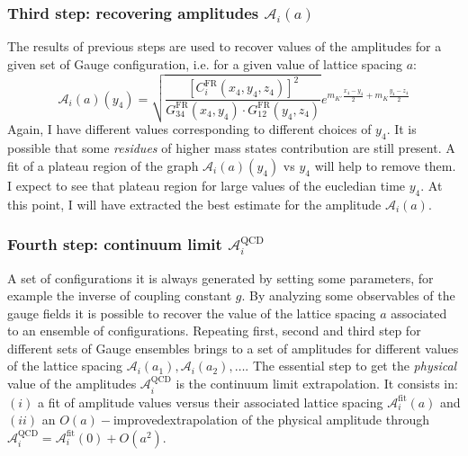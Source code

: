\documentclass[english, LaM, oneside, noexaminfo]{sapthesis}
\newcommand{\oaid}{$O(a)-$improved}
\begin{document}
\subsubsection*{Third step: recovering amplitudes $\mathcal{A}_i(a)$}
\noindent
The results of previous steps are used to recover values of the amplitudes for a given set of Gauge configuration, i.e. for a given value of lattice spacing $a$:
\begin{equation*}
    \mathcal{A}_i (a) (y_4) = \sqrt{\frac{\left[C_i^\text{FR}(x_4,y_4,z_4)\right]^2}{G_{34}^\text{FR}(x_4,y_4) \cdot G_{12}^\text{FR}(y_4,z_4)}} e^{m_{K'}\frac{x_4-y_4}{2} + m_{K}\frac{y_4-z_4}{2}}
\end{equation*}
Again, I have different values corresponding to different choices of $y_4$.
It is possible that some {\it residues} of higher mass states contribution are still present.
A fit of a plateau region of the graph $\mathcal{A}_i (a) (y_4)$ vs $y_4$ will help to remove them.
I expect to see that plateau region for large values of the eucledian time $y_4$.
At this point, I will have extracted the best estimate for the amplitude $\mathcal{A}_i (a)$.

\subsubsection*{Fourth step: continuum limit $\mathcal{A}_i^\text{QCD}$}
\noindent
A set of configurations it is always generated by setting some parameters, for example the inverse of coupling constant $g$.
By analyzing some observables of the gauge fields it is possible to recover the value of the lattice spacing $a$ associated to an ensemble of configurations.
\newline
Repeating first, second and third step for different sets of Gauge ensembles brings to a set of amplitudes for different values of the lattice spacing $\mathcal{A}_i (a_1), \mathcal{A}_i (a_2), \dots$.
The essential step to get the {\it physical} value of the amplitudes $\mathcal{A}_i^\text{QCD}$ is the continuum limit extrapolation.
It consists in:
$(i)$ a fit of amplitude values versus their associated lattice spacing $\mathcal{A}_i^\text{fit} (a) $ and
$(ii)$ an \oaid\space extrapolation of the physical amplitude through $ \mathcal{A}_i^\text{QCD} = \mathcal{A}_i^\text{fit} (0) + O(a^2)$.
\end{document}
